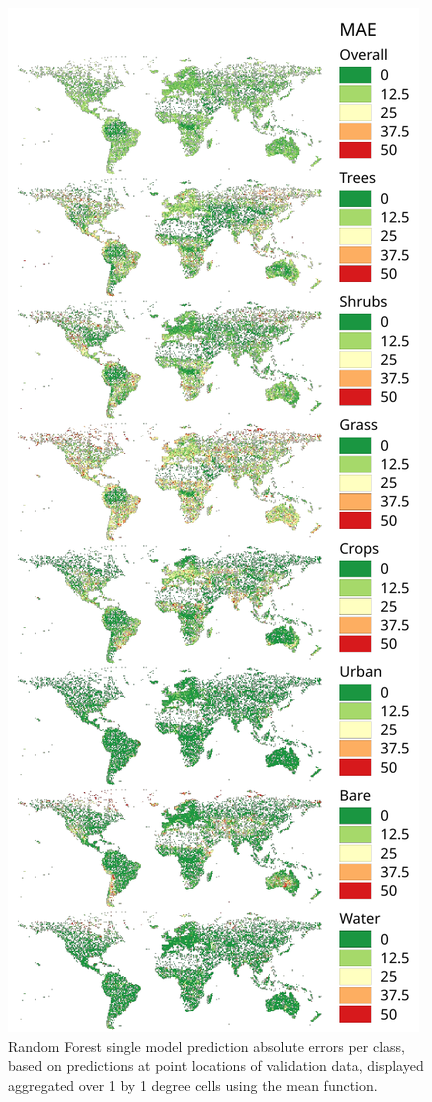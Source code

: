 \documentclass[a4paper,10pt]{article}
\begin{document}
\begin{figure}
    \centering
    \includegraphics[height=0.8\textheight]{article-figures/maps/2020-05-22-spatialerrors}
    \caption{Random Forest single model prediction absolute errors per class, based on predictions at point locations of validation data, displayed aggregated over 1 by 1 degree cells using the mean function.}
    \label{fig-resid-rf-1m-uncor}
\end{figure}
\end{document}
